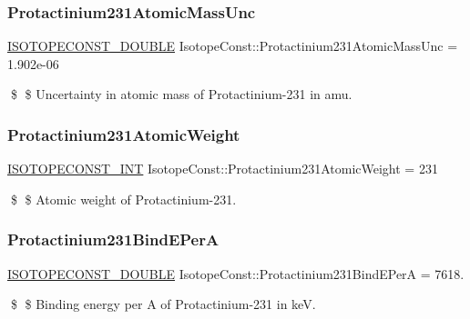 \subsubsection{\texorpdfstring{Protactinium231\+Atomic\+Mass\+Unc}{Protactinium231AtomicMassUnc}}
{\footnotesize\ttfamily \mbox{\hyperlink{group___isotope_const-_macros_ga8f45a7272ce02c0b4c65c44636ed719a}{I\+S\+O\+T\+O\+P\+E\+C\+O\+N\+S\+T\+\_\+\+D\+O\+U\+B\+LE}} Isotope\+Const\+::\+Protactinium231\+Atomic\+Mass\+Unc = 1.\+902e-\/06}

\$ \$ Uncertainty in atomic mass of Protactinium-\/231 in amu. \mbox{\label{group___isotope_const-_protactinium-_pa231_ga675992cb606d7077ce1b13d6327c0441}} 
\subsubsection{\texorpdfstring{Protactinium231\+Atomic\+Weight}{Protactinium231AtomicWeight}}
{\footnotesize\ttfamily \mbox{\hyperlink{group___isotope_const-_macros_ga5f18360b3e99483a35c32d789e62621c}{I\+S\+O\+T\+O\+P\+E\+C\+O\+N\+S\+T\+\_\+\+I\+NT}} Isotope\+Const\+::\+Protactinium231\+Atomic\+Weight = 231}

\$ \$ Atomic weight of Protactinium-\/231. \mbox{\label{group___isotope_const-_protactinium-_pa231_ga91f1e3e9a0e9bbe7c2d031316a0b9d8b}} 
\subsubsection{\texorpdfstring{Protactinium231\+Bind\+E\+PerA}{Protactinium231BindEPerA}}
{\footnotesize\ttfamily \mbox{\hyperlink{group___isotope_const-_macros_ga8f45a7272ce02c0b4c65c44636ed719a}{I\+S\+O\+T\+O\+P\+E\+C\+O\+N\+S\+T\+\_\+\+D\+O\+U\+B\+LE}} Isotope\+Const\+::\+Protactinium231\+Bind\+E\+PerA = 7618.}

\$ \$ Binding energy per A of Protactinium-\/231 in keV. \mbox{\label{group___isotope_const-_protactinium-_pa231_ga71595bab9d5b3e7124024fef34e2f8dc}} 
